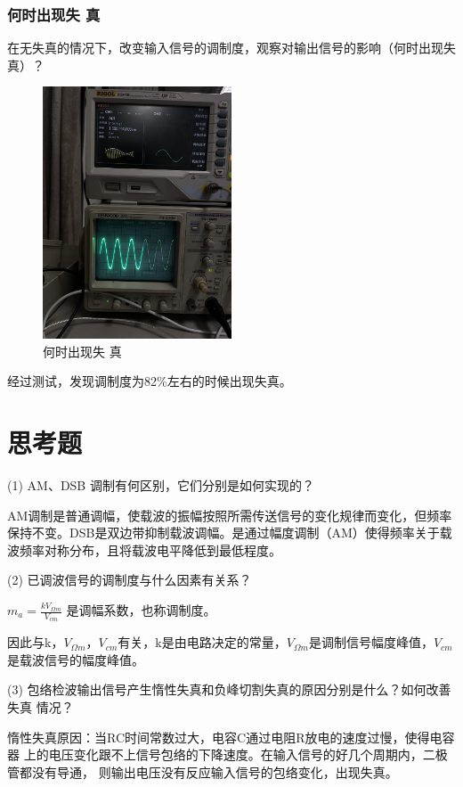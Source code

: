 \documentclass{../source/Experiment}
\begin{document}
\subsubsection{何时出现失
    真}
在无失真的情况下，改变输入信号的调制度，观察对输出信号的影响（何时出现失
真）？
\begin{figure}[H]
    \centering
    \includegraphics[width = 0.5\textwidth,angle=270]{lab6/8.jpg}
    \caption{何时出现失
        真}

\end{figure}

经过测试，发现调制度为82\%左右的时候出现失真。

\section{思考题}
 (1) AM、DSB 调制有何区别，它们分别是如何实现的？

AM调制是普通调幅，使载波的振幅按照所需传送信号的变化规律而变化，但频率保持不变。DSB是双边带抑制载波调幅。是通过幅度调制（AM）使得频率关于载波频率对称分布，且将载波电平降低到最低程度。


(2) 已调波信号的调制度与什么因素有关系？

$m_{a}=\frac{k V_{\Omega m}}{V_{c m}}$ 是调幅系数，也称调制度。

因此与k，$V_{\Omega m}，V_{c m}$有关，k是由电路决定的常量，$V_{\Omega m}$是调制信号幅度峰值，$V_{c m}$是载波信号的幅度峰值。


(3) 包络检波输出信号产生惰性失真和负峰切割失真的原因分别是什么？如何改善失真
情况？

惰性失真原因：当RC时间常数过大，电容C通过电阻R放电的速度过慢，使得电容器
上的电压变化跟不上信号包络的下降速度。在输入信号的好几个周期内，二极管都没有导通，
则输出电压没有反应输入信号的包络变化，出现失真。
\end{document}
